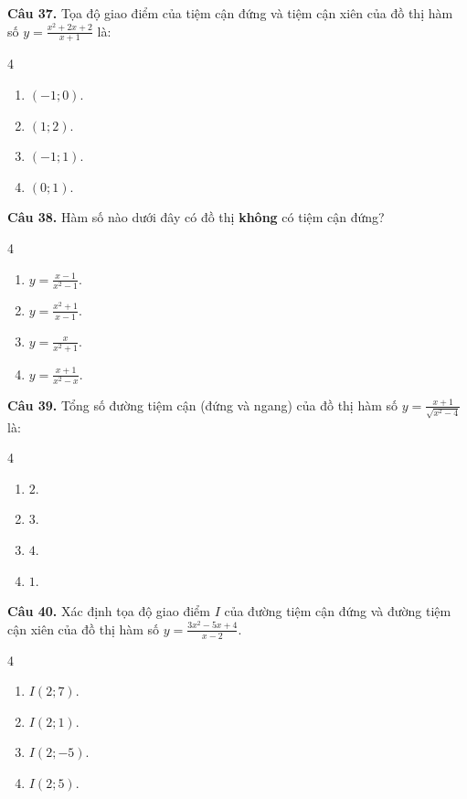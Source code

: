 \documentclass[12pt]{article}
\begin{document}
	\vspace{0.4cm}
	\noindent \textbf{Câu 37.} Tọa độ giao điểm của tiệm cận đứng và tiệm cận xiên của đồ thị hàm số $y = \frac{x^2 + 2x + 2}{x + 1}$ là:
	\begin{multicols}{4}
		\begin{enumerate}[label=\textbf{\Alph*.}]
			\item $(-1; 0)$.
			\item $(1; 2)$.
			\item $(-1; 1)$.
			\item $(0; 1)$.
		\end{enumerate}
	\end{multicols}
	
	\vspace{0.4cm}
	\noindent \textbf{Câu 38.} Hàm số nào dưới đây có đồ thị \textbf{không} có tiệm cận đứng?
	\begin{multicols}{4}
		\begin{enumerate}[label=\textbf{\Alph*.}]
			\item $y = \frac{x - 1}{x^2 - 1}$.
			\item $y = \frac{x^2 + 1}{x - 1}$.
			\item $y = \frac{x}{x^2 + 1}$.
			\item $y = \frac{x + 1}{x^2 - x}$.
		\end{enumerate}
	\end{multicols}
	
	\vspace{0.4cm}
	\noindent \textbf{Câu 39.} Tổng số đường tiệm cận (đứng và ngang) của đồ thị hàm số $y = \frac{x + 1}{\sqrt{x^2 - 4}}$ là:
	\begin{multicols}{4}
		\begin{enumerate}[label=\textbf{\Alph*.}]
			\item $2$.
			\item $3$.
			\item $4$.
			\item $1$.
		\end{enumerate}
	\end{multicols}
	
	
	\vspace{0.4cm}
	\noindent \textbf{Câu 40.} Xác định tọa độ giao điểm $I$ của đường tiệm cận đứng và đường tiệm cận xiên của đồ thị hàm số $y = \frac{3x^2 - 5x + 4}{x - 2}$.
	\begin{multicols}{4}
		\begin{enumerate}[label=\textbf{\Alph*.}]
			\item $I(2; 7)$.
			\item $I(2; 1)$.
			\item $I(2; -5)$.
			\item $I(2; 5)$.
		\end{enumerate}
	\end{multicols}
	
\end{document}
